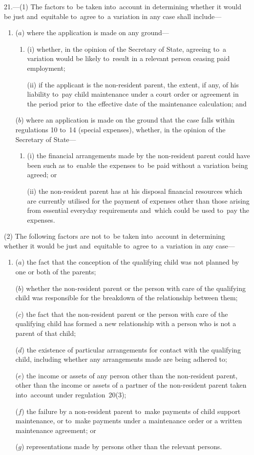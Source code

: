 \documentclass[12pt,a4paper]{article}
\begin{document}
21.---(1)  The factors to~be taken into~account in determining whether it would be just and~equitable to~agree to~a variation in any case shall include—
\begin{enumerate}\item[]
($a$) where the application is made on any ground—
\begin{enumerate}\item[]
(i) whether, in the opinion of the Secretary of State, agreeing to~a variation would be likely to~result in a relevant person ceasing paid employment;

(ii) if the applicant is the non-resident parent, the extent, if any, of his liability to~pay child maintenance under a court order or agreement in the period prior to~the effective date of the maintenance calculation; and
\end{enumerate}

($b$) where an application is made on the ground that the case falls within regulations 10 to~14 (special expenses), whether, in the opinion of the Secretary of State—
\begin{enumerate}\item[]
(i) the financial arrangements made by the non-resident parent could have been such as to~enable the expenses to~be paid without a variation being agreed; or

(ii) the non-resident parent has at his disposal financial resources which are currently utilised for the payment of expenses other than those arising from essential everyday requirements and~which could be used to~pay the expenses.
\end{enumerate}
\end{enumerate}

(2) The following factors are not to~be taken into~account in determining whether it would be just and~equitable to~agree to~a variation in any case—
\begin{enumerate}\item[]
($a$) the fact that the conception of the qualifying child was not planned by one or both of the parents;

($b$) whether the non-resident parent or the person with care of the qualifying child was responsible for the breakdown of the relationship between them;

($c$) the fact that the non-resident parent or the person with care of the qualifying child has formed a new relationship with a person who is not a parent of that child;

($d$) the existence of particular arrangements for contact with the qualifying child, including whether any arrangements made are being adhered to;

($e$) the income or assets of any person other than the non-resident parent, other than the income or assets of a partner of the non-resident parent taken into~account under regulation~20(3);

($f$) the failure by a non-resident parent to~make payments of child support maintenance, or to~make payments under a maintenance order or a written maintenance agreement; or

($g$) representations made by persons other than the relevant persons.
\end{enumerate}
\end{document}
